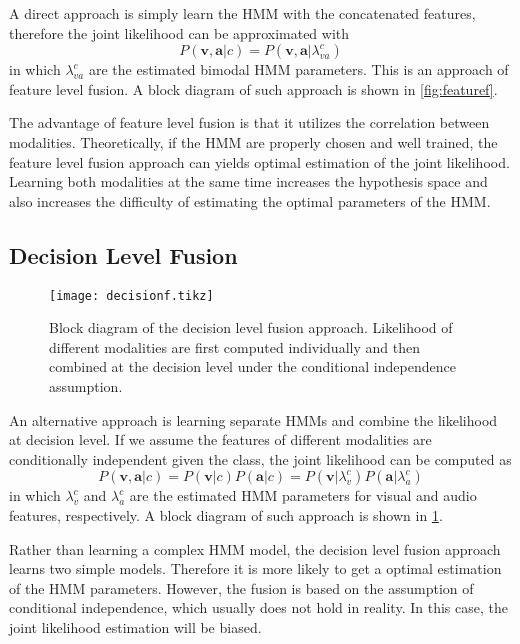 \documentclass[12pt,final,twoside]{report}
\begin{document}
A direct approach is simply learn the HMM with the concatenated features, therefore the joint likelihood can be approximated with 
\begin{equation}
  P(\mathbf{v},\mathbf{a}|c) = P(\mathbf{v},\mathbf{a}|\lambda_{va}^c)
\end{equation}
in which $\lambda_{va}^c$ are the estimated bimodal HMM parameters. This is an approach of feature level fusion. A block diagram of such approach is shown in \cref{fig:featuref}.

The advantage of feature level fusion is that it utilizes the correlation between modalities. Theoretically, if the HMM are properly chosen and well trained, the feature level fusion approach can yields optimal estimation of the joint likelihood. Learning both modalities at the same time increases the hypothesis space and also increases the difficulty of estimating the optimal parameters of the HMM.

\subsection{Decision Level Fusion}
\begin{figure}[t]
  \centering
  \texttt{[image: decisionf.tikz]}
  \caption[Block diagram of the decision level fusion approach.]{Block diagram of the decision level fusion approach. Likelihood of different modalities are first computed individually and then combined at the decision level under the conditional independence assumption.}
  \label{fig:decisionf}
\end{figure}

An alternative approach is learning separate HMMs and combine the likelihood at decision level. If we assume the features of different modalities are conditionally independent given the class, the joint likelihood can be computed as
\begin{equation}
  P(\mathbf{v},\mathbf{a}|c) = P(\mathbf{v}|c) P(\mathbf{a}|c) = P(\mathbf{v}|\lambda_v^c) P(\mathbf{a}|\lambda_a^c)
\end{equation}
in which $\lambda_{v}^c$ and $\lambda_{a}^c$ are the estimated HMM parameters for visual and audio features, respectively. A block diagram of such approach is shown in \cref{fig:decisionf}.

Rather than learning a complex HMM model, the decision level fusion approach learns two simple models. Therefore it is more likely to get a optimal estimation of the HMM parameters. However, the fusion is based on the assumption of conditional independence, which usually does not hold in reality. In this case, the joint likelihood estimation will be biased.
\end{document}
